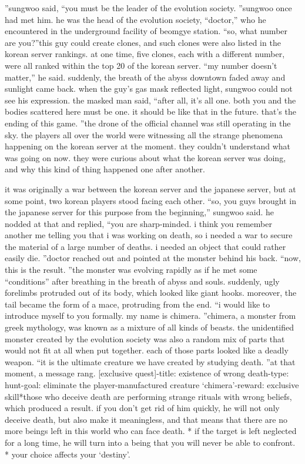 ”sungwoo said, “you must be the leader of the evolution society.
”sungwoo once had met him.
 he was the head of the evolution society, “doctor,” who he encountered in the underground facility of beomgye station.
“so, what number are you?”this guy could create clones, and such clones were also listed in the korean server rankings.
at one time, five clones, each with a different number, were all ranked within the top 20 of the korean server.
“my number doesn’t matter,” he said.
suddenly, the breath of the abyss downtown faded away and sunlight came back.
when the guy’s gas mask reflected light, sungwoo could not see his expression.
the masked man said, “after all, it’s all one.
 both you and the bodies scattered here must be one.
 it should be like that in the future.
 that’s the ending of this game.
”the drone of the official channel was still operating in the sky.
 the players all over the world were witnessing all the strange phenomena happening on the korean server at the moment.
they couldn’t understand what was going on now.
 they were curious about what the korean server was doing, and why this kind of thing happened one after another.


it was originally a war between the korean server and the japanese server, but at some point, two korean players stood facing each other.
“so, you guys brought in the japanese server for this purpose from the beginning,” sungwoo said.
he nodded at that and replied, “you are sharp-minded.
 i think you remember another me telling you that i was working on death, so i needed a war to secure the material of a large number of deaths.
 i needed an object that could rather easily die.
”doctor reached out and pointed at the monster behind his back.
“now, this is the result.
”the monster was evolving rapidly as if he met some “conditions” after breathing in the breath of abyss and souls.
suddenly, ugly forelimbs protruded out of its body, which looked like giant hooks.
 moreover, the tail became the form of a mace, protruding from the end.
“i would like to introduce myself to you formally.
 my name is chimera.
”chimera, a monster from greek mythology, was known as a mixture of all kinds of beasts.
the unidentified monster created by the evolution society was also a random mix of parts that would not fit at all when put together.
 each of those parts looked like a deadly weapon.
“it is the ultimate creature we have created by studying death.
”at that moment, a message rang.
[exclusive quest]-title: existence of wrong death-type: hunt-goal: eliminate the player-manufactured creature ‘chimera’-reward: exclusive skill*those who deceive death are performing strange rituals with wrong beliefs, which produced a result.
 if you don’t get rid of him quickly, he will not only deceive death, but also make it meaningless, and that means that there are no more beings left in this world who can face death.
* if the target is left neglected for a long time, he will turn into a being that you will never be able to confront.
* your choice affects your ‘destiny’.


 